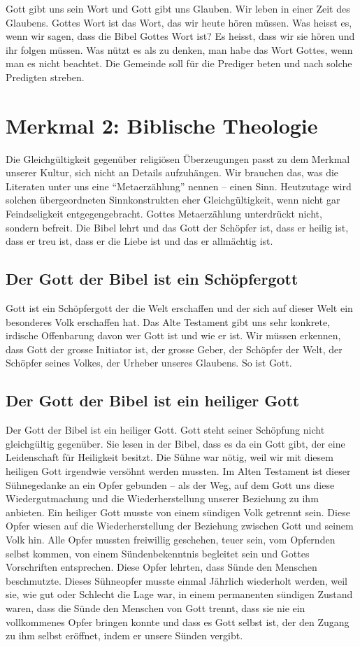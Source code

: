 \documentclass{../../inc/mybib}
\begin{document}
Gott gibt uns sein Wort und Gott gibt uns Glauben. Wir leben in einer Zeit des Glaubens. Gottes Wort ist das Wort, das wir heute hören müssen. Was heisst es, wenn wir sagen, dass die Bibel Gottes Wort ist? Es heisst, dass wir sie hören und ihr folgen müssen. Was nützt es als zu denken, man habe das Wort Gottes, wenn man es nicht beachtet. Die Gemeinde soll für die Prediger beten und nach solche Predigten streben.
\section*{Merkmal 2: Biblische Theologie}
Die Gleichgültigkeit gegenüber religiösen Überzeugungen passt zu dem Merkmal unserer Kultur, sich nicht an Details aufzuhängen. Wir brauchen das, was die Literaten unter uns eine \enquote{Metaerzählung} nennen -- einen Sinn. Heutzutage wird solchen übergeordneten Sinnkonstrukten eher Gleichgültigkeit, wenn nicht gar Feindseligkeit entgegengebracht.
Gottes Metaerzählung unterdrückt nicht, sondern befreit. Die Bibel lehrt und das Gott der Schöpfer ist, dass er heilig ist, dass er treu ist, dass er die Liebe ist und das er allmächtig ist.
\subsection*{Der Gott der Bibel ist ein Schöpfergott}
Gott ist ein Schöpfergott der die Welt erschaffen und der sich auf dieser Welt ein besonderes Volk erschaffen hat. Das Alte Testament gibt uns sehr konkrete, irdische Offenbarung davon wer Gott ist und wie er ist. Wir müssen erkennen, dass Gott der grosse Initiator ist, der grosse Geber, der Schöpfer der Welt, der Schöpfer seines Volkes, der Urheber unseres Glaubens. So ist Gott.
\subsection*{Der Gott der Bibel ist ein heiliger Gott}
Der Gott der Bibel ist ein heiliger Gott. Gott steht seiner Schöpfung nicht gleichgültig gegenüber. Sie lesen in der Bibel, dass es da ein Gott gibt, der eine Leidenschaft für Heiligkeit besitzt.
Die Sühne war nötig, weil wir mit diesem heiligen Gott irgendwie versöhnt werden mussten. Im Alten Testament ist dieser Sühnegedanke an ein Opfer gebunden -- als der Weg, auf dem Gott uns diese Wiedergutmachung und die Wiederherstellung unserer Beziehung zu ihm anbieten. Ein heiliger Gott musste von einem sündigen Volk getrennt sein. Diese Opfer wiesen auf die Wiederherstellung der Beziehung zwischen Gott und seinem Volk hin. Alle Opfer mussten freiwillig geschehen, teuer sein, vom Opfernden selbst kommen, von einem Sündenbekenntnis begleitet sein und Gottes Vorschriften entsprechen. Diese Opfer lehrten, dass Sünde den Menschen beschmutzte. Dieses Sühneopfer musste einmal Jährlich wiederholt werden, weil sie, wie gut oder Schlecht die Lage war, in einem permanenten sündigen Zustand waren, dass die Sünde den Menschen von Gott trennt, dass sie nie ein vollkommenes Opfer bringen konnte und dass es Gott selbst ist, der den Zugang zu ihm selbst eröffnet, indem er unsere Sünden vergibt.
\end{document}
